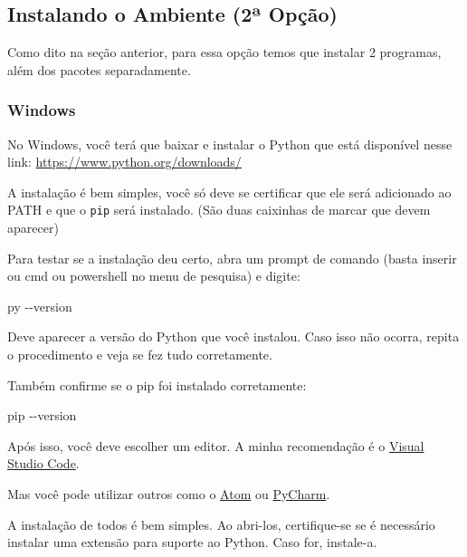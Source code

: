 \documentclass[11pt, brazilian]{article}
\newenvironment{Shaded}{}{}
\newcommand{\ExtensionTok}[1]{{#1}}
\newcommand{\AttributeTok}[1]{\textcolor[rgb]{0.49,0.56,0.16}{{#1}}}
\begin{document}
\hypertarget{instalando-o-ambiente-2uxaa-opuxe7uxe3o}{%
\subsection{Instalando o Ambiente (2ª
Opção)}\label{instalando-o-ambiente-2uxaa-opuxe7uxe3o}}

Como dito na seção anterior, para essa opção temos que instalar 2
programas, além dos pacotes separadamente.

\hypertarget{windows-1}{%
\subsubsection{Windows}\label{windows-1}}

No Windows, você terá que baixar e instalar o Python que está disponível
nesse link: \url{https://www.python.org/downloads/}

A instalação é bem simples, você só deve se certificar que ele será
adicionado ao PATH e que o \texttt{pip} será instalado. (São duas
caixinhas de marcar que devem aparecer)

Para testar se a instalação deu certo, abra um prompt de comando (basta
inserir ou cmd ou powershell no menu de pesquisa) e digite:

\begin{Shaded}
\begin{Highlighting}[]
\ExtensionTok{py} \AttributeTok{{-}{-}version}
\end{Highlighting}
\end{Shaded}

Deve aparecer a versão do Python que você instalou. Caso isso não
ocorra, repita o procedimento e veja se fez tudo corretamente.

Também confirme se o pip foi instalado corretamente:

\begin{Shaded}
\begin{Highlighting}[]
\ExtensionTok{pip} \AttributeTok{{-}{-}version}
\end{Highlighting}
\end{Shaded}

Após isso, você deve escolher um editor. A minha recomendação é o
\href{https://code.visualstudio.com/}{Visual Studio Code}.

Mas você pode utilizar outros como o \href{https://atom.io/}{Atom} ou
\href{https://www.jetbrains.com/pt-br/pycharm/download/}{PyCharm}.

A instalação de todos é bem simples. Ao abri-los, certifique-se se é
necessário instalar uma extensão para suporte ao Python. Caso for,
instale-a.
\end{document}
